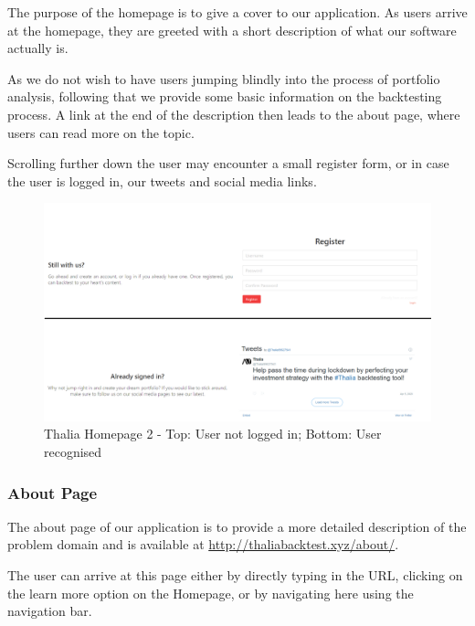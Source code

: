 \documentclass[main.tex]{subfiles}
\begin{document}
The purpose of the homepage is to give a cover to our application. As users arrive at the homepage, they are greeted with a short description of what our software actually is.

As we do not wish to have users jumping blindly into the process of portfolio analysis, following that we provide some basic information on the backtesting process. A link at the end of the description then leads to the about page, where users can read more on the topic.



Scrolling further down the user may encounter a small register form, or in case the user is logged in, our tweets and social media links.



\begin{figure}[H]

   \centering

   \includegraphics[width=\textwidth]{08Appendices/081User/081Pictures/homepage_bottom.png}

   \caption{Thalia Homepage 2 - Top: User not logged in; Bottom: User recognised}

   \label{thalia_home_bottom}

\end{figure}



\subsubsection{About Page}



The about page of our application is to provide a more detailed description of the problem domain and is available at \url{http://thaliabacktest.xyz/about/}.

The user can arrive at this page either by directly typing in the URL, clicking on the learn more option on the Homepage, or by navigating here using the navigation bar.
\end{document}
